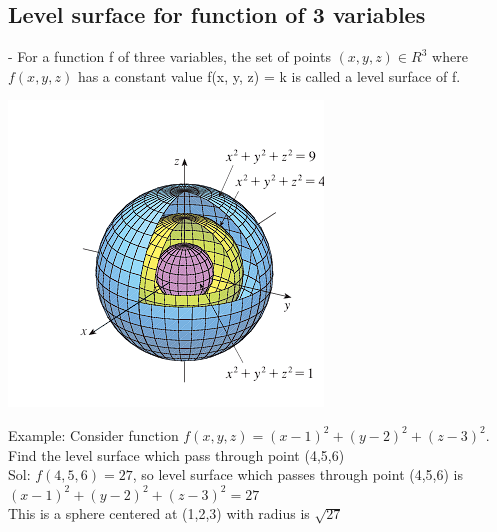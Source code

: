\documentclass[12pt]{article}
\begin{document}
\subsection{Level surface for function of 3 variables }
- For a function f of three variables, the set of points $(x, y, z) \in R^3$ where $f(x, y, z)$ has a constant value f(x, y, z) = k is called a level surface of f.\\
\begin{center}
    \includegraphics[scale = 1]{i.png}
\end{center}

Example: Consider function $f(x,y,z)=(x-1)^2 +(y-2)^2+ (z-3)^2$. Find the level surface which pass through point (4,5,6)\\
Sol: $f(4,5,6)=27$, so level surface which passes through point (4,5,6) is  $(x-1)^2 +(y-2)^2+ (z-3)^2=27$\\
This is a sphere centered at (1,2,3) with radius is $\sqrt{27}$
\end{document}
